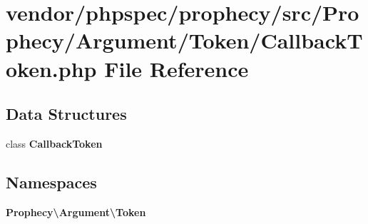 \section{vendor/phpspec/prophecy/src/\+Prophecy/\+Argument/\+Token/\+Callback\+Token.php File Reference}
\label{_callback_token_8php}
\subsection*{Data Structures}
\begin{DoxyCompactItemize}
\item 
class {\bf Callback\+Token}
\end{DoxyCompactItemize}
\subsection*{Namespaces}
\begin{DoxyCompactItemize}
\item 
 {\bf Prophecy\textbackslash{}\+Argument\textbackslash{}\+Token}
\end{DoxyCompactItemize}
